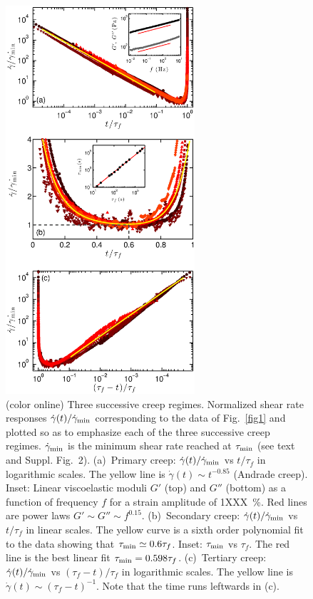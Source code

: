 \documentclass[twocolumn,superscriptaddress,showpacs,preprintnumbers,amsmath,amssymb,prl]{revtex4}
\newcommand\gp{\dot\gamma}
\newcommand\gpm{\dot\gamma_{\rm min}}
\newcommand\taum{\tau_{\rm min}}
\begin{document}
\begin{figure}
\centering
\includegraphics[width=7cm,clip]{Fig2.eps}
\caption{(color online)  Three successive creep regimes. Normalized shear rate responses $\gp(t)/\gpm$ corresponding to the data of Fig.~\ref{fig1} and plotted so as to emphasize each of the three successive creep regimes. $\gpm$ is the minimum shear rate reached at $\taum$ (see text and Suppl. Fig.~2). (a)~Primary creep: $\gp(t)/\gpm$ vs $t/\tau_f$ in logarithmic scales. The yellow line is $\gp(t)\sim t^{-0.85}$ (Andrade creep). Inset: Linear viscoelastic moduli $G'$ (top) and $G''$ (bottom) as a function of frequency $f$ for a strain amplitude of 1XXX~\%. Red lines are power laws $G'\sim G''\sim f^{0.15}$. (b)~Secondary creep: $\gp(t)/\gpm$ vs $t/\tau_f$ in linear scales. The yellow curve is a sixth order polynomial fit to the data showing that $\taum\simeq 0.6\tau_f$. Inset: $\taum$ vs $\tau_f$. The red line is the best linear fit $\taum=0.598\tau_f$. (c)~Tertiary creep: $\gp(t)/\gpm$ vs $(\tau_f-t)/\tau_f$ in logarithmic scales. The yellow line is $\gp(t)\sim (\tau_f-t)^{-1}$. Note that the time runs leftwards in (c).
\label{fig2}}
\end{figure} 
\end{document}
